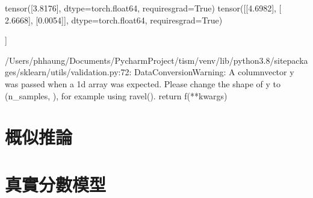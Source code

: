 \documentclass[letterpaper,10pt,english]{sphinxmanual}
\begin{document}
\begin{sphinxVerbatim}[commandchars=\\\{\}]
tensor([3.8176], dtype=torch.float64, requires\PYGZus{}grad=True)
tensor([[\PYGZhy{}4.6982],
        [ 2.6668],
        [\PYGZhy{}0.0054]], dtype=torch.float64, requires\PYGZus{}grad=True)
\end{sphinxVerbatim}

\begin{sphinxVerbatim}[commandchars=\\\{\}]
   
  
 
\end{sphinxVerbatim}

\begin{sphinxVerbatim}[commandchars=\\\{\}]
[3.81736449]
[[\PYGZhy{}4.69795962  2.66667074 \PYGZhy{}0.00543114]]
\end{sphinxVerbatim}
\begin{sphinxalltt}
/Users/phhaung/Documents/PycharmProject/tism/venv/lib/python3.8/site\sphinxhyphen{}packages/sklearn/utils/validation.py:72: DataConversionWarning: A column\sphinxhyphen{}vector y was passed when a 1d array was expected. Please change the shape of y to (n\_samples, ), for example using ravel().
  return f(**kwargs)

\end{sphinxalltt}


\chapter{概似推論}
\label{\detokenize{notebook/likelihood-inference:id1}}\label{\detokenize{notebook/likelihood-inference::doc}}

\chapter{真實分數模型}
\label{\detokenize{notebook/true-score-model:id1}}\label{\detokenize{notebook/true-score-model::doc}}
\end{document}
